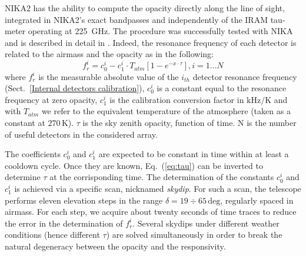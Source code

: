 \documentclass[]{aa} %
\begin{document}
NIKA2 has the ability to compute the opacity directly along the line of sight, integrated in NIKA2's exact bandpasses and independently of the IRAM tau-meter operating at 225~GHz. The procedure was successfully tested with NIKA and is described in detail in \cite{Catalano2014}. Indeed, the resonance frequency of each detector is related to the airmass and the opacity as in the following:
\begin{equation}\label{eq:skydip}
f^{i}_{r} = c^{i}_0 - c^{i}_1 \cdot T_{atm}[1 - e^{- x \cdot \tau}],  i = 1 ... N
\label{eq:tau}
\end{equation}
where $f^{i}_{r}$ is the measurable absolute value of the $i_{th}$ detector resonance frequency (Sect.~\ref{Internal detectors calibration}), $c^{i}_0$ is a constant equal to the resonance frequency at zero opacity, $c^{i}_1$ is the calibration conversion factor in $\mathrm{kHz/K}$ and with $T_{atm}$ we refer to the equivalent temperature of the atmosphere (taken as a constant at $270\,\mathrm{K}$). $\tau$ is the sky zenith opacity, function of time. N is the number of useful detectors in the considered array. 

The coefficients $c^{i}_0$ and $c^{i}_1$ are expected to be constant in time within at least a cooldown cycle. Once they are known, Eq.~(\ref{eq:tau}) can be inverted to determine $\tau$ at the corrisponding time. The determination of the constants $c^{i}_0$ and $c^{i}_1$ is achieved via a specific scan, nicknamed \emph{skydip}. For such a scan, the telescope performs eleven elevation steps in the range $\delta = 19\div65\,\mathrm{deg}$, regularly spaced in airmass. For each step, we acquire about twenty seconds of time traces to reduce the error in the determination of $f^{i}_{r}$. Several skydips under different weather conditions (hence different $\tau$) are solved simultaneously in order to break the natural degeneracy between the opacity and the responsivity.
\end{document}
